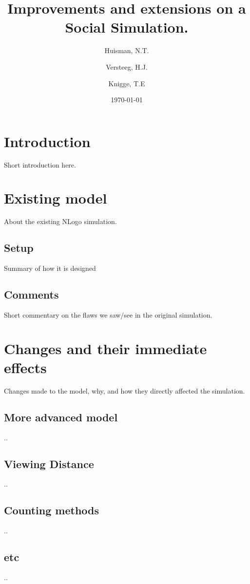 \documentclass[a4paper]{article}
\title{Improvements and extensions on a Social Simulation.}
\author{Huisman, N.T.\\
\and
Versteeg, H.J.\\
\and
Knigge, T.E
}
\date{\today}
\begin{document}
\maketitle
\clearpage
\tableofcontents
\clearpage

\section{Introduction}
Short introduction here.

\clearpage

\section{Existing model}
About the existing NLogo simulation.

\subsection{Setup}
Summary of how it is designed

\subsection{Comments}
Short commentary on the flaws we saw/see in the original simulation.

\clearpage

\section{Changes and their immediate effects}
Changes made to the model, why, and how they directly  affected the simulation.

\subsection{More advanced model}
..

\subsection{Viewing Distance}
..

\subsection{Counting methods}
..

\subsection{etc}
..
\end{document}
